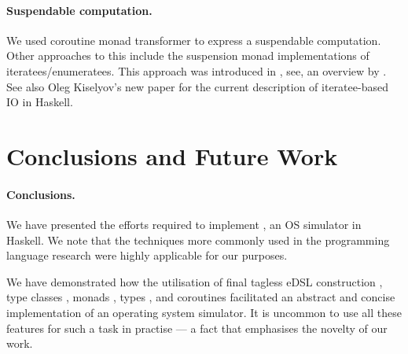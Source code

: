 \paragraph{Suspendable computation.} We used coroutine monad transformer \cite{cmt} to express a suspendable computation.
Other approaches to this include the suspension monad implementations of iteratees/enumeratees. This approach was introduced in \cite{oleg-iteratee}, see, \eg an overview by \citeauthor{lato2010iteratee} \cite{lato2010iteratee}.
See also Oleg Kiselyov's new paper \cite{springerlink:10.1007/978-3-642-29822-6_15} for the current description of iteratee-based IO in Haskell.




\section{Conclusions and Future Work}
\label{sec:concl-future-work}

\paragraph{Conclusions.}
We have presented the efforts required to implement \soosim, an OS simulator in Haskell.
We note that the techniques more commonly used in the programming language research were highly applicable for our purposes.

We have demonstrated how the utilisation of final tagless eDSL construction \cite{final_tagless_embedding,Hofer:2008:PED:1449913.1449935}, type classes \cite{Hall:1996:TCH:227699.227700}, monads \cite{Wadler:1990:CM:91556.91592},  types \cite{Abadi:1991:DTS:103135.103138}, and coroutines \cite{coroutines,cmt} facilitated an abstract and concise implementation of an operating system simulator.
It is uncommon to use all these features for such a task in practise --- a fact that emphasises the novelty of our work.

